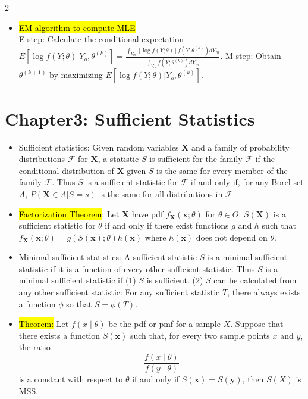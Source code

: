 \documentclass[a4paper,10pt]{article}
\begin{document}
\begin{multicols}{2}
\begin{itemize}
    \item \hl{EM algorithm to compute MLE}\\E-step: Calculate the conditional expectation 
    $E[\log f(Y; \theta) | Y_o, \theta^{(k)}] = \frac{\int_{Y_m} [\log f(Y; \theta)] f(Y; \theta^{(k)}) dY_m}{\int_{Y_m} f(Y; \theta^{(k)}) dY_m}.$  
    M-step: Obtain $\theta^{(k+1)}$ by maximizing    
    $
    E[\log f(Y; \theta) | Y_o, \theta^{(k)}].$

\end{itemize}

\section*{Chapter3: Sufficient Statistics}
\begin{itemize}
    \item Sufficient statistics: Given random variables $\bm{X}$ and a family of probability distributions $\mathcal{F}$ for $\bm{X}$, a statistic $S$ is sufficient for the family $\mathcal{F}$ if the conditional distribution of $\bm{X}$ given $S$ is the same for every member of the family $\mathcal{F}$. Thus $S$ is a sufficient statistic for $\mathcal{F}$ if and only if, for any Borel set $A$, $P(\bm{X} \in A | S = s)$ is the same for all distributions in $\mathcal{F}$.
    \item \hl{Factorization Theorem}: Let $\bm{X}$ have pdf $f_{\bm{X}}(\bm{x}; \theta)$ for $\theta \in \Theta$. $S(\bm{X})$ is a sufficient statistic for $\theta$ if and only if there exist functions $g$ and $h$ such that $f_{\bm{X}}(\bm{x}; \theta) = g(S(\bm{x}); \theta) h(\bm{x})$ where $h(\bm{x})$ does not depend on $\theta$.
    \item Minimal sufficient statistics: A sufficient statistic $S$ is a minimal sufficient statistic if it is a function of every other sufficient statistic. Thus $S$ is a minimal sufficient statistic if (1) $S$ is sufficient.
    (2) $S$ can be calculated from any other sufficient statistic: For any sufficient statistic $T$, there always exists a function $\phi$ so that $S = \phi(T)$.
    \item \hl{Theorem:} Let \( f(x \mid \theta) \) be the pdf or pmf for a sample \( X \). Suppose that there exists a function \( S(\mathbf{x}) \) such that, for every two sample points \( x \) and \( y \), the ratio  
    \[
    \frac{f(x \mid \theta)}{f(y \mid \theta)}
    \]
    is a constant with respect to \( \theta \) if and only if \( S(\mathbf{x}) = S(\mathbf{y}) \), then \( S(X) \) is MSS.




\end{itemize}
\end{multicols}
\end{document}
